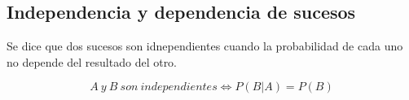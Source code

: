 \documentclass[a4paper,spanish,9pt]{extarticle}
\begin{document}
\begin{multicols*}{2}
\subsection{Independencia y dependencia de sucesos}
Se dice que dos sucesos son idnependientes cuando la probabilidad de cada uno no depende del resultado del otro. 

$$A\ y \ B\ son \ independientes \Longleftrightarrow P(B|A)=P(B)$$


 
  








\end{multicols*}
\end{document}
